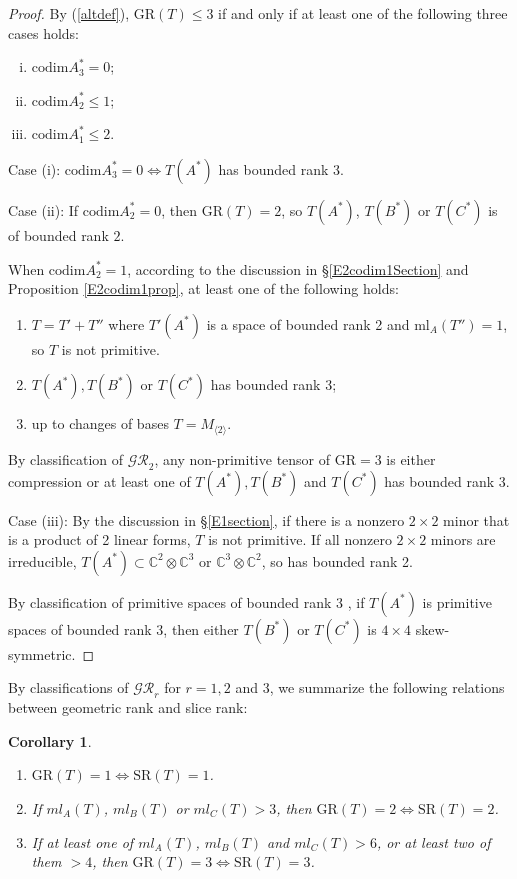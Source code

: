 \documentclass[10pt]{article} %
\newcommand{\GR}{\mathrm{GR}}
\newcommand{\SR}{\mathrm{SR}}
\newtheorem{cor}[thm]{Corollary}
\theoremstyle{definition}
\begin{document}
\begin{proof}
By (\ref{altdef}), $\mathrm{GR}(T)\leq 3$ if and only if at least one of the following three cases holds:
\begin{enumerate}[(i)]
    \item $\mathrm{codim} A^*_3=0$;
    \item $\mathrm{codim} A^*_2\leq 1$;
    \item $\mathrm{codim} A^*_1\leq 2$.
\end{enumerate}

Case (i): $\mathrm{codim} A^*_3=0\iff T(A^*)$ has bounded rank 3.

Case (ii): If $\mathrm{codim} A^*_2=0$, then $\mathrm{GR}(T)=2$, so $T(A^*)$, $T(B^*)$ or $T(C^*)$ is of bounded rank $2$.

When $\mathrm{codim} A^*_2=1$, according to the discussion in \S\ref{E2codim1Section} and Proposition \ref{E2codim1prop}, at least one of the following holds:
\begin{enumerate}
    \item $T=T'+T''$ where $T'(A^*)$ is a space of bounded rank 2 and $\mathrm{ml}_A(T'')=1$, so $T$ is not primitive. 
    \item $T(A^*),T(B^*)$ or $T(C^*)$ has bounded rank 3;
    \item up to changes of bases $T=M_{\langle 2 \rangle}$.
\end{enumerate}
By classification of $\mathcal{GR}_2$, any non-primitive tensor of $\GR=3$ is either compression or at least one of $T(A^*),T(B^*)$ and $T(C^*)$ has bounded rank 3.

Case (iii): By the discussion in \S\ref{E1section}, if there is a nonzero $2\times 2$ minor that is a product of 2 linear forms, $T$ is not primitive. If all nonzero $2\times2$ minors are irreducible, $T(A^*)\subset \mathbb{C}^2\otimes\mathbb{C}^3$ or $\mathbb{C}^3\otimes\mathbb{C}^2$, so has bounded rank 2.

By classification of primitive spaces of bounded rank 3 \cite{EH88}, if $T(A^*)$ is primitive spaces of bounded rank 3, then either $T(B^*)$ or $T(C^*)$ is $4\times 4$ skew-symmetric.
\end{proof}

By classifications of $\mathcal{GR}_r$ for $r=1,2$ and $3$, we summarize the following relations between geometric rank and slice rank:
\begin{cor}
\begin{enumerate}
    \item $\GR(T)=1\iff\SR(T)=1$.
    \item If $ml_A(T)$, $ml_B(T)$ or $ml_C(T)> 3$, then $\GR(T)=2\iff\SR(T)=2$.
    \item If at least one of $ml_A(T)$, $ml_B(T)$ and $ml_C(T)> 6$, or at least two of them $>4$, then $\GR(T)=3\iff\SR(T)=3$.
\end{enumerate}
\end{cor}
\end{document}
